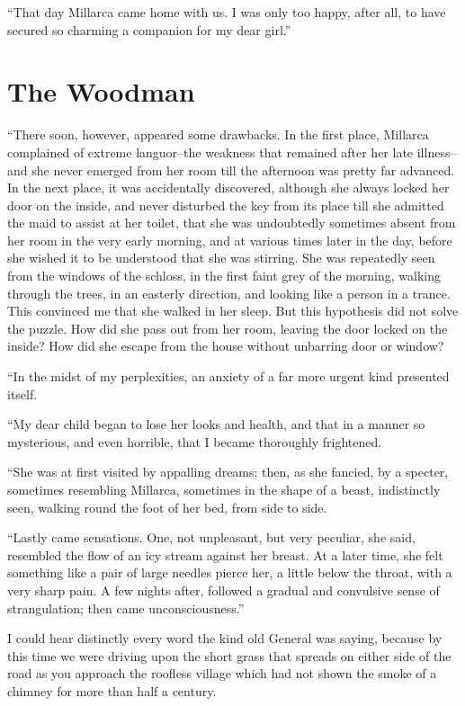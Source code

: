 \documentclass[11pt,twoside,makeidx,hidelinks,]{memoir}
\begin{document}
``That day Millarca came home with us. I was only too happy, after all,
to have secured so charming a companion for my dear girl.''

\pbreak{}

\chapter{The Woodman}\hypertarget{the-woodman}{}\label{the-woodman}

``There soon, however, appeared some drawbacks. In the first place,
Millarca complained of extreme languor--the weakness that remained after
her late illness--and she never emerged from her room till the afternoon
was pretty far advanced. In the next place, it was accidentally
discovered, although she always locked her door on the inside, and never
disturbed the key from its place till she admitted the maid to assist at
her toilet, that she was undoubtedly sometimes absent from her room in
the very early morning, and at various times later in the day, before
she wished it to be understood that she was stirring. She was repeatedly
seen from the windows of the schloss, in the first faint grey of the
morning, walking through the trees, in an easterly direction, and
looking like a person in a trance. This convinced me that she walked in
her sleep. But this hypothesis did not solve the puzzle. How did she
pass out from her room, leaving the door locked on the inside? How did
she escape from the house without unbarring door or window?

``In the midst of my perplexities, an anxiety of a far more urgent kind
presented itself.

``My dear child began to lose her looks and health, and that in a manner
so mysterious, and even horrible, that I became thoroughly frightened.

``She was at first visited by appalling dreams; then, as she fancied, by
a specter, sometimes resembling Millarca, sometimes in the shape of a
beast, indistinctly seen, walking round the foot of her bed, from
side to side.

``Lastly came sensations. One, not unpleasant, but very peculiar, she
said, resembled the flow of an icy stream against her breast. At a later
time, she felt something like a pair of large needles pierce her, a
little below the throat, with a very sharp pain. A few nights after,
followed a gradual and convulsive sense of strangulation; then came
unconsciousness.''

I could hear distinctly every word the kind old General was saying,
because by this time we were driving upon the short grass that spreads
on either side of the road as you approach the roofless village which
had not shown the smoke of a chimney for more than half a century.
\end{document}
